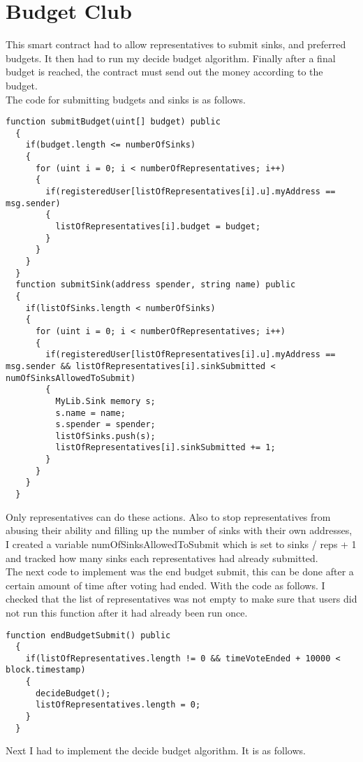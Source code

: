 \section{Budget Club}
This smart contract had to allow representatives to submit sinks, and preferred budgets. It then had to run my decide budget algorithm. Finally after a final budget is reached, the contract must send out the money according to the budget. \\
The code for submitting budgets and sinks is as follows.
\begin{lstlisting}
function submitBudget(uint[] budget) public
  {
    if(budget.length <= numberOfSinks)
    {
      for (uint i = 0; i < numberOfRepresentatives; i++)
      {
        if(registeredUser[listOfRepresentatives[i].u].myAddress == msg.sender)
        {
          listOfRepresentatives[i].budget = budget;
        }
      }
    }
  }
  function submitSink(address spender, string name) public
  {
    if(listOfSinks.length < numberOfSinks)
    {
      for (uint i = 0; i < numberOfRepresentatives; i++)
      {
        if(registeredUser[listOfRepresentatives[i].u].myAddress == msg.sender && listOfRepresentatives[i].sinkSubmitted < numOfSinksAllowedToSubmit)
        {
          MyLib.Sink memory s;
          s.name = name;
          s.spender = spender;
          listOfSinks.push(s);
          listOfRepresentatives[i].sinkSubmitted += 1;
        }
      }
    }
  }
\end{lstlisting}
Only representatives can do these actions. Also to stop representatives from abusing their ability and filling up the number of sinks with their own addresses, I created a variable numOfSinksAllowedToSubmit which is set to sinks / reps + 1 and tracked how many sinks each representatives had already submitted. \\
The next code to implement was the end budget submit, this can be done after a certain amount of time after voting had ended. With the code as follows. I checked that the list of representatives was not empty to make sure that users did not run this function after it had already been run once.
\begin{lstlisting}
function endBudgetSubmit() public
  {
    if(listOfRepresentatives.length != 0 && timeVoteEnded + 10000 < block.timestamp)
    {
      decideBudget();
      listOfRepresentatives.length = 0;
    }
  }
\end{lstlisting}
Next I had to implement the decide budget algorithm. It is as follows. 
